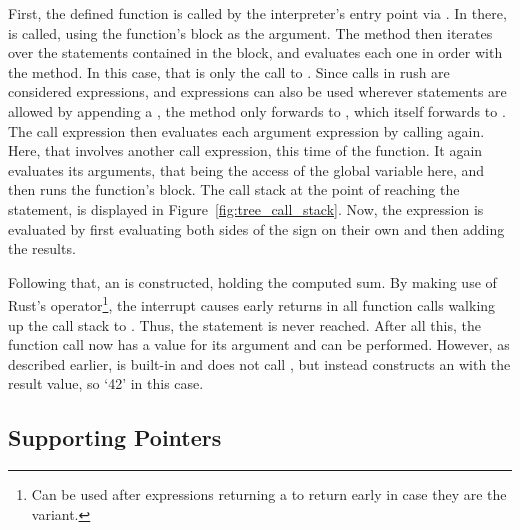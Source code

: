 First, the defined  function is called by the interpreter's entry point via .
In there,  is called, using the  function's block as the argument.
The  method then iterates over the statements contained in the block, and evaluates each one in order with the  method.
In this case, that is only the call to .
Since calls in rush are considered expressions, and expressions can also be used wherever statements are allowed by appending a \qVerb{;}, the  method only forwards to , which itself forwards to .
The call expression then evaluates each argument expression by calling  again.
Here, that involves another call expression, this time of the  function.
It again evaluates its arguments, that being the access of the global variable  here, and then runs the function's block.
The call stack at the point of reaching the  statement, is displayed in Figure~\ref{fig:tree_call_stack}.
Now, the expression  is evaluated by first evaluating both sides of the \qVerb{+} sign on their own and then adding the results.

Following that, an  is constructed, holding the computed sum.
By making use of Rust's  operator\footnote{Can be used after expressions returning a  to return early in case they are the  variant.}, the interrupt causes early returns in all function calls walking up the call stack to .
Thus, the statement  is never reached.
After all this, the  function call now has a value for its argument and can be performed.
However, as described earlier,  is built-in and does not call , but instead constructs an  with the result value, so `42' in this case.

\subsection{Supporting Pointers}\label{sec:tree_pointers}

